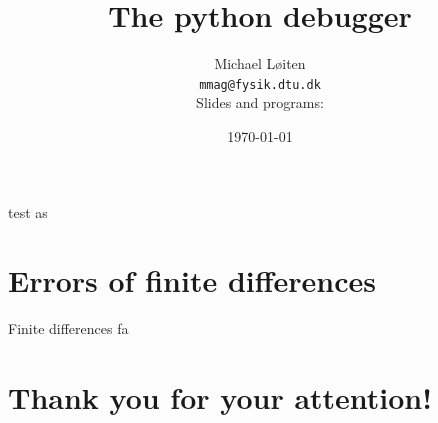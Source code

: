 \documentclass[
    size=20pt,
    style=sailor,
    display=slides,
    paper=smartboard,
    orient=landscape,
]{powerdot}
\title{The python debugger}
\author{Michael L{\o}iten\\
\texttt{mmag@fysik.dtu.dk}\\
Slides and programs:}
\date{\today}
\begin{document}
\maketitle






\begin{wideslide}[method=direct]{test}
as
\end{wideslide}




\section{Errors of finite differences}




\begin{slide}{Finite differences}
fa
\end{slide}
\section[template=wideslide,tocsection=hidden]{Thank you for your attention!}
\end{document}
